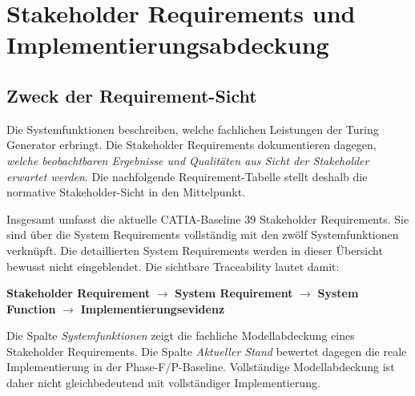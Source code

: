 
\section{Stakeholder Requirements und Implementierungsabdeckung}
\label{sec:stakeholder_requirements_coverage}

\subsection{Zweck der Requirement-Sicht}

Die Systemfunktionen beschreiben, welche fachlichen Leistungen der Turing
Generator erbringt. Die Stakeholder Requirements dokumentieren dagegen,
\emph{welche beobachtbaren Ergebnisse und Qualitäten aus Sicht der Stakeholder
erwartet werden}. Die nachfolgende Requirement-Tabelle stellt deshalb die
normative Stakeholder-Sicht in den Mittelpunkt.

Insgesamt umfasst die aktuelle CATIA-Baseline 39 Stakeholder Requirements. Sie
sind über die System Requirements vollständig mit den zwölf Systemfunktionen
verknüpft. Die detaillierten System Requirements werden in dieser Übersicht
bewusst nicht eingeblendet. Die sichtbare Traceability lautet damit:

\begin{center}
\textbf{Stakeholder Requirement}
$\longrightarrow$
\textbf{System Requirement}
$\longrightarrow$
\textbf{System Function}
$\longrightarrow$
\textbf{Implementierungsevidenz}
\end{center}

\begin{tcolorbox}[
  enhanced,
  breakable,
  colback=blue!3,
  colframe=TuringBlue,
  title={Lesart der Tabelle},
  fonttitle=\bfseries,
  boxrule=0.8pt,
  arc=2mm
]
Die Spalte \emph{Systemfunktionen} zeigt die fachliche Modellabdeckung eines
Stakeholder Requirements. Die Spalte \emph{Aktueller Stand} bewertet dagegen
die reale Implementierung in der Phase-F/P-Baseline. Vollständige
Modellabdeckung ist daher nicht gleichbedeutend mit vollständiger
Implementierung.
\end{tcolorbox}

